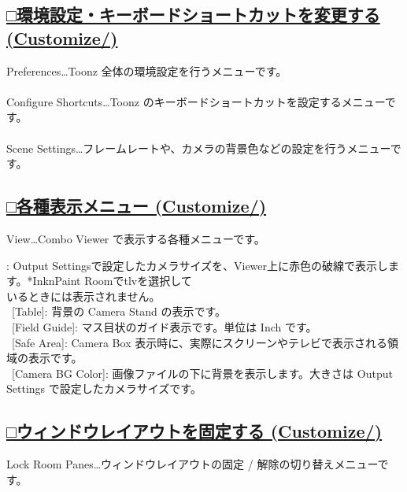 \documentclass[a4paper,10pt]{article}
\begin{document}
\subsection*{\uline{□環境設定・キーボードショートカットを変更する (Customize/)}}

\normalsize
\noindent Preferences…Toonz 全体の環境設定を行うメニューです。\\
\\
Configure Shortcuts…Toonz のキーボードショートカットを設定するメニューです。\\
\\
Scene Settings…フレームレートや、カメラの背景色などの設定を行うメニューです。\\

\subsection*{\uline{□各種表示メニュー (Customize/)}}

\normalsize
\noindent View…Combo Viewer で表示する各種メニューです。\par
\footnotesize
{}: Output Settingsで設定したカメラサイズを、Viewer上に赤色の破線で表示します。*InknPaint Roomでtlvを選択して\\
いるときには表示されません。\\
\ [Table]: 背景の Camera Stand の表示です。\\
\ [Field Guide]: マス目状のガイド表示です。単位は Inch です。\\
\ [Safe Area]: Camera Box 表示時に、実際にスクリーンやテレビで表示される領域の表示です。\\
\ [Camera BG Color]: 画像ファイルの下に背景を表示します。大きさは Output Settings で設定したカメラサイズです。\\

\subsection*{\uline{□ウィンドウレイアウトを固定する (Customize/)}}

\normalsize
\noindent Lock Room Panes…ウィンドウレイアウトの固定 / 解除の切り替えメニューです。
\end{document}

